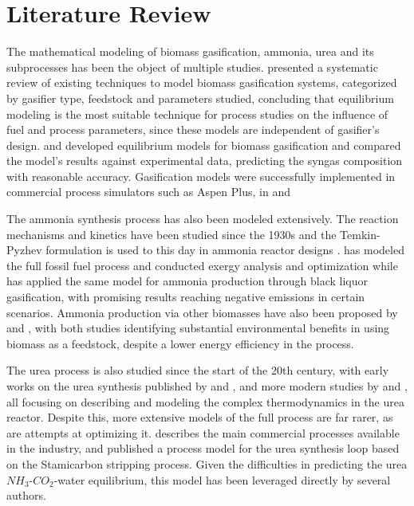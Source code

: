 \documentclass[a4paper, titlepage]{article}
\begin{document}
\section{Literature Review}

The mathematical modeling of biomass gasification, ammonia, urea and its subprocesses has been the object of multiple
studies. \textcite{baruahModelingBiomassGasification2014} presented a systematic review of  existing techniques to model
biomass gasification systems, categorized by gasifier type, feedstock and parameters studied,
concluding that equilibrium modeling is the most suitable technique for process studies on the influence of fuel and
process parameters, since these models are independent of gasifier's design.
\textcite{gambarottaNonstoichiometricEquilibriumModel2018} and \textcite{azzoneDevelopmentEquilibriumModel2012} developed
equilibrium models for biomass gasification and compared the model’s results against experimental data, predicting the
syngas composition with reasonable accuracy. Gasification models were successfully implemented in commercial process
simulators such as Aspen Plus, in \textcite{hanModelingDowndraftBiomass2017} and
\textcite{ramzanSimulationHybridBiomass2011}

The ammonia synthesis process has also been modeled extensively. The reaction mechanisms and kinetics have been
studied since the 1930s \cite{gillespieThermodynamicTreatmentChemical1930} and the Temkin-Pyzhev formulation is
used to this day in ammonia reactor designs \cite{temkinKineticsAmmoniaSynthesis1940}
\cite{singhSimulationAmmoniaSynthesis1979} \cite{nielsenAmmoniaCatalysisManufacture1995}.
\textcite{florez-orregoProcessSynthesisOptimization2018} has modeled the full fossil fuel process and conducted
exergy analysis and optimization while \textcite{domingosExergyEnvironmentalAnalysis2021} has applied the same model
for ammonia production through black liquor gasification, with promising results reaching negative emissions in
certain scenarios. Ammonia production via other biomasses have also been proposed by
\textcite{florez-orregoComparativeExergyEconomic2019} and \textcite{tunaTechnoeconomicAssessmentNonfossil2014}, with
both studies identifying substantial environmental benefits in using biomass as a feedstock, despite a lower energy
efficiency in the process.

The urea process is also studied since the start of the 20th century, with early works on the urea synthesis published
by \textcite{frejacquesBasesTheoriquesSynthese1948} and \textcite{kawasumiEquilibriumCO2NH3UreaH2OSystem1953}, and
more modern studies by \textcite{lemkowitzPhaseBehaviourAmmoniacarbon1972} and
\textcite{islaSimulationUreaSynthesis1993}, all focusing on describing and modeling the complex thermodynamics in the
urea reactor. Despite this, more extensive models of the full process are far rarer, as are attempts at optimizing it.
\textcite{meessenUreaSynthesis2014} describes the main commercial processes available in the industry, and
\textcite{aspentechASPEN88Technical2011} published a process model for the urea synthesis loop based on the
Stamicarbon stripping process. Given the difficulties in predicting the urea $NH_3$-$CO_2$-water equilibrium, this
model has been leveraged directly by several authors.
\end{document}
